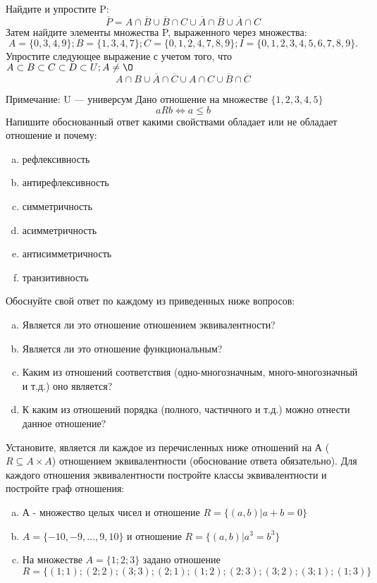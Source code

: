 \documentclass[10pt]{exam}
\begin{document}
\begin{questions}
\question
Найдите и упростите P:
\begin{equation*}
\overline{P} = A \cap \overline{B} \cup \overline{B} \cap C \cup \overline{A} \cap \overline{B} \cup \overline{A} \cap C
\end{equation*}
Затем найдите элементы множества P, выраженного через множества:
\begin{equation*}
A = \{0, 3, 4, 9\}; 
B = \{1, 3, 4, 7\};
C = \{0, 1, 2, 4, 7, 8, 9\};
I = \{0, 1, 2, 3, 4, 5, 6, 7, 8, 9\}.
\end{equation*}\question
Упростите следующее выражение с учетом того, что $A\subset B \subset C \subset D \subset U; A \neq \O$
\begin{equation*}
A \cap B \cup \overline{A} \cap \overline{C} \cup A \cap C \cup \overline{B} \cap \overline{C}
\end{equation*}

Примечание: U — универсум\question
Дано отношение на множестве $\{1, 2, 3, 4, 5\}$ 
\begin{equation*}
aRb \iff a \leq b
\end{equation*}
Напишите обоснованный ответ какими свойствами обладает или не обладает отношение и почему:   
\begin{enumerate} [a)]\setcounter{enumi}{0}
\item рефлексивность
\item антирефлексивность
\item симметричность
\item асимметричность
\item антисимметричность
\item транзитивность
\end{enumerate}

Обоснуйте свой ответ по каждому из приведенных ниже вопросов:
\begin{enumerate} [a)]\setcounter{enumi}{0}
    \item Является ли это отношение отношением эквивалентности?
    \item Является ли это отношение функциональным?
    \item Каким из отношений соответствия (одно-многозначным, много-многозначный и т.д.) оно является?
    \item К каким из отношений порядка (полного, частичного и т.д.) можно отнести данное отношение?
\end{enumerate}


\question
Установите, является ли каждое из перечисленных ниже отношений на А ($R \subseteq A \times A$) отношением эквивалентности (обоснование ответа обязательно). Для каждого отношения эквивалентности 
постройте классы эквивалентности и постройте граф отношения:
\begin{enumerate}[a)]\setcounter{enumi}{0}
\item А - множество целых чисел и отношение $R = \{(a,b)|a + b = 0\}$
\item $A = \{-10, -9, …, 9, 10\}$ и отношение $R = \{(a,b)|a^{3} = b^{3}\}$
\item На множестве $A = \{1; 2; 3\}$ задано отношение $R = \{(1; 1); (2; 2); (3; 3); (2; 1); (1; 2); (2; 3); (3; 2); (3; 1); (1; 3)\}$


\end{enumerate}
\end{questions}
\end{document}
